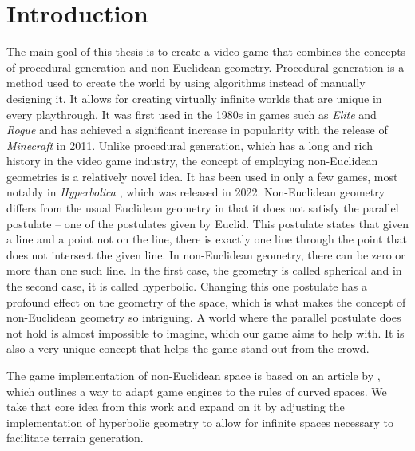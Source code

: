 \chapter{Introduction}\label{ch:introduction}


The main goal of this thesis is to create a video game that combines the concepts of procedural generation and non-Euclidean geometry.
Procedural generation is a method used to create the world by using algorithms instead of manually designing it.
It allows for creating virtually infinite worlds that are unique in every playthrough.
It was first used in the 1980s in games such as \textit{Elite} \cite{Elite1984} and \textit{Rogue} \cite{Rogue1980} and has achieved a significant increase in popularity with the release of \textit{Minecraft} \cite{Minecraft} in 2011.
Unlike procedural generation, which has a long and rich history in the video game industry, the concept of employing non-Euclidean geometries is a relatively novel idea.
It has been used in only a few games, most notably in \textit{Hyperbolica} \cite{Hyperbolica}, which was released in 2022.
Non-Euclidean geometry differs from the usual Euclidean geometry in that it does not satisfy the parallel postulate -- one of the postulates given by Euclid.
This postulate states that given a line and a point not on the line, there is exactly one line through the point that does not intersect the given line.
In non-Euclidean geometry, there can be zero or more than one such line.
In the first case, the geometry is called spherical and in the second case, it is called hyperbolic.
Changing this one postulate has a profound effect on the geometry of the space, which is what makes the concept of non-Euclidean geometry so intriguing.
A world where the parallel postulate does not hold is almost impossible to imagine, which our game aims to help with.
It is also a very unique concept that helps the game stand out from the crowd.

The game implementation of non-Euclidean space is based on an article by \citeauthor{Szirmay-Kalos2022} \cite{Szirmay-Kalos2022}, which outlines a way to adapt game engines to the rules of curved spaces.
We take that core idea from this work and expand on it by adjusting the implementation of hyperbolic geometry to allow for infinite spaces necessary to facilitate terrain generation.

